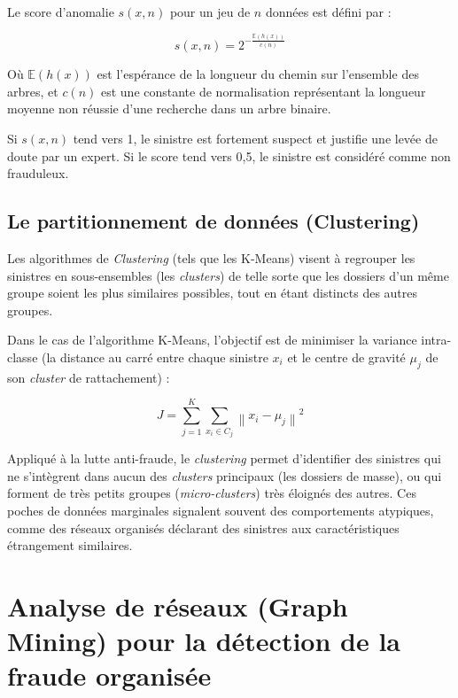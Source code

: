 Le score d'anomalie $s(x, n)$ pour un jeu de $n$ données est défini par :

\begin{equation}
    s(x, n) = 2^{-\frac{\mathbb{E}(h(x))}{c(n)}}
\end{equation}

Où $\mathbb{E}(h(x))$ est l'espérance de la longueur du chemin sur l'ensemble des arbres, et $c(n)$ est une constante de normalisation représentant la longueur moyenne non réussie d'une recherche dans un arbre binaire.

Si $s(x, n)$ tend vers 1, le sinistre est fortement suspect et justifie une levée de doute par un expert. Si le score tend vers 0,5, le sinistre est considéré comme non frauduleux.

\subsection{Le partitionnement de données (Clustering)}

Les algorithmes de \textit{Clustering} (tels que les K-Means) visent à regrouper les sinistres en sous-ensembles (les \textit{clusters}) de telle sorte que les dossiers d'un même groupe soient les plus similaires possibles, tout en étant distincts des autres groupes.

Dans le cas de l'algorithme K-Means, l'objectif est de minimiser la variance intra-classe (la distance au carré entre chaque sinistre $x_i$ et le centre de gravité $\mu_j$ de son \textit{cluster} de rattachement) :

\begin{equation}
    J = \sum_{j=1}^{K} \sum_{x_i \in C_j} \left\| x_i - \mu_j \right\|^2
\end{equation}

Appliqué à la lutte anti-fraude, le \textit{clustering} permet d'identifier des sinistres qui ne s'intègrent dans aucun des \textit{clusters} principaux (les dossiers de masse), ou qui forment de très petits groupes (\textit{micro-clusters}) très éloignés des autres. Ces poches de données marginales signalent souvent des comportements atypiques, comme des réseaux organisés déclarant des sinistres aux caractéristiques étrangement similaires.

\section{Analyse de réseaux (Graph Mining) pour la détection de la fraude organisée}


